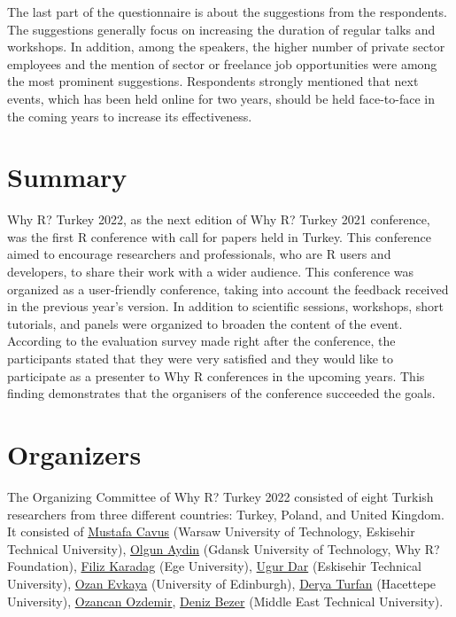 The last part of the questionnaire is about the suggestions from the respondents. The suggestions generally focus on increasing the duration of regular talks and workshops. In addition, among the speakers, the higher number of private sector employees and the mention of sector or freelance job opportunities were among the most prominent suggestions. Respondents strongly mentioned that next events,  which has been held online for two years, should be held face-to-face in the coming years to increase its effectiveness.

\section{Summary}

Why R? Turkey 2022, as the next edition of Why R? Turkey 2021 conference, was the first R conference  with call for papers held in Turkey. This conference aimed to encourage researchers and professionals, who are R users and developers, to share their work with a wider audience. This conference was organized as a user-friendly conference, taking into account the feedback received in the previous year's version. In addition to scientific sessions, workshops, short tutorials, and panels were organized to broaden the content of the event. According to the evaluation survey made right after the conference, the participants stated that they were very satisfied and they would like to participate as a presenter to Why R conferences in the upcoming years. This finding demonstrates that the organisers of the conference succeeded the goals. 

\section{Organizers}

The Organizing Committee of Why R? Turkey 2022 consisted of eight Turkish researchers from three different countries: Turkey, Poland, and United Kingdom. It consisted of \href{https://www.linkedin.com/in/mustafacavusphd/}{Mustafa Cavus} (Warsaw University of Technology, Eskisehir Technical University), \href{https://www.linkedin.com/in/olgun-aydin/}{Olgun Aydin} (Gdansk University of Technology, Why R? Foundation), \href{https://www.linkedin.com/in/filizkaradag/}{Filiz Karadag} (Ege University), \href{https://www.linkedin.com/in/ugurdar/}{Ugur Dar} (Eskisehir Technical University), \href{https://www.linkedin.com/in/ozanevkaya/}{Ozan Evkaya} (University of Edinburgh), \href{https://www.linkedin.com/in/derya-turfan-460498229/}{Derya Turfan} (Hacettepe University), \href{https://www.linkedin.com/in/ozancan-\%C3\%B6zdemir-40b94768/}{Ozancan Ozdemir}, \href{https://www.linkedin.com/in/deniz-bezer-55ab7519b/}{Deniz Bezer} (Middle East Technical University).


